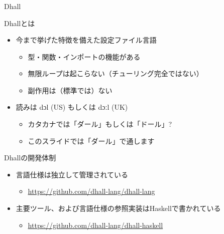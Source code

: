 \documentclass[unicode,12pt]{beamer}
\begin{document}
\begin{frame}[plain]\frametitle{}
  \centering
  \vspace{2em}
  \Huge\fontsize{60}{70}\brush\textcolor{text}{Dhall}
\end{frame}

\begin{frame}{Dhallとは}
  \begin{itemize}
    \item 今まで挙げた特徴を備えた設定ファイル言語
      \begin{itemize}
      \item \alert{型・関数・インポート}の機能がある
      \item 無限ループは起こらない（チューリング完全ではない）
      \item 副作用は（標準では）ない
      \end{itemize}
    \item 読みは {\doulos dɔl} (US) もしくは {\doulos dɔːl} (UK)
      \begin{itemize}
      \item カタカナでは「ダール」もしくは「ドール」?
      \item このスライドでは「ダール」で通します
      \end{itemize}
  \end{itemize}
\end{frame}

\begin{frame}{Dhallの開発体制}
  \begin{itemize}
    \item 言語仕様は独立して管理されている
      \begin{itemize}
      \item \url{https://github.com/dhall-lang/dhall-lang}
      \end{itemize}
    \item 主要ツール、および言語仕様の参照実装はHaskellで書かれている
      \begin{itemize}
      \item \url{https://github.com/dhall-lang/dhall-haskell}
      \end{itemize}
  \end{itemize}
\end{frame}
\end{document}

